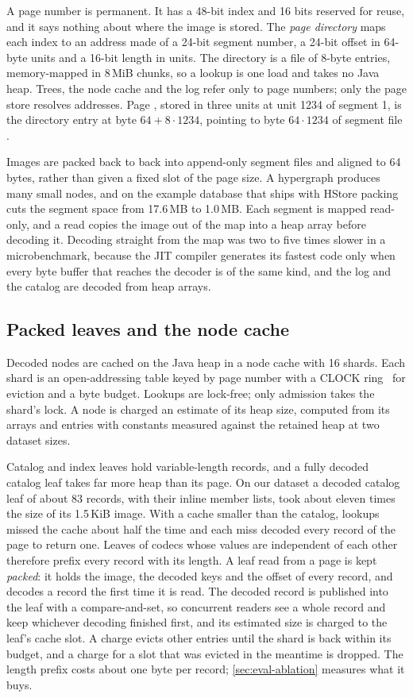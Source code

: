 A page number is permanent. It has a 48-bit index and 16 bits reserved for reuse, and it says nothing about where the image is stored. The \emph{page directory} maps each index to an address made of a 24-bit segment number, a 24-bit offset in 64-byte units and a 16-bit length in units. The directory is a file of 8-byte entries, memory-mapped in 8\,MiB chunks, so a lookup is one load and takes no Java heap. Trees, the node cache and the log refer only to page numbers; only the page store resolves addresses. Page , stored in three units at unit 1234 of segment 1, is the directory entry at byte $64+8\cdot1234$, pointing to byte $64\cdot 1234$ of segment file .

Images are packed back to back into append-only segment files and aligned to 64 bytes, rather than given a fixed slot of the page size. A hypergraph produces many small nodes, and on the example database that ships with HStore packing cuts the segment space from 17.6\,MB to 1.0\,MB. Each segment is mapped read-only, and a read copies the image out of the map into a heap array before decoding it. Decoding straight from the map was two to five times slower in a microbenchmark, because the JIT compiler generates its fastest code only when every byte buffer that reaches the decoder is of the same kind, and the log and the catalog are decoded from heap arrays.

\subsection{Packed leaves and the node cache}
\label{sec:cache}

Decoded nodes are cached on the Java heap in a node cache with 16 shards. Each shard is an open-addressing table keyed by page number with a CLOCK ring~\cite{clock} for eviction and a byte budget. Lookups are lock-free; only admission takes the shard's lock. A node is charged an estimate of its heap size, computed from its arrays and entries with constants measured against the retained heap at two dataset sizes.

Catalog and index leaves hold variable-length records, and a fully decoded catalog leaf takes far more heap than its page. On our dataset a decoded catalog leaf of about 83 records, with their inline member lists, took about eleven times the size of its 1.5\,KiB image. With a cache smaller than the catalog, lookups missed the cache about half the time and each miss decoded every record of the page to return one. Leaves of codecs whose values are independent of each other therefore prefix every record with its length. A leaf read from a page is kept \emph{packed}: it holds the image, the decoded keys and the offset of every record, and decodes a record the first time it is read. The decoded record is published into the leaf with a compare-and-set, so concurrent readers see a whole record and keep whichever decoding finished first, and its estimated size is charged to the leaf's cache slot. A charge evicts other entries until the shard is back within its budget, and a charge for a slot that was evicted in the meantime is dropped. The length prefix costs about one byte per record; \cref{sec:eval-ablation} measures what it buys.
